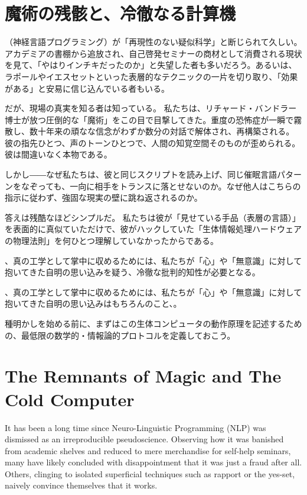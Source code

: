 \ifja
    \chapter{魔術の残骸と、冷徹なる計算機}
    \NLP（神経言語プログラミング）が「再現性のない疑似科学」と断じられて久しい。アカデミアの書棚から追放され、自己啓発セミナーの商材として消費される現状を見て、「やはりインチキだったのか」と失望した者も多いだろう。あるいは、ラポールやイエスセットといった表層的なテクニックの一片を切り取り、「効果がある」と安易に信じ込んでいる者もいる。

    だが、現場の真実を知る者は知っている。
    私たちは、リチャード・バンドラー博士が放つ圧倒的な「魔術」をこの目で目撃してきた。重度の恐怖症が一瞬で霧散し、数十年来の頑なな信念がわずか数分の対話で解体され、再構築される。彼の指先ひとつ、声のトーンひとつで、人間の知覚空間そのものが歪められる。彼は間違いなく本物である。

    しかし――なぜ私たちは、彼と同じスクリプトを読み上げ、同じ催眠言語パターンをなぞっても、一向に相手をトランスに落とせないのか。なぜ他人はこちらの指示に従わず、強固な現実の壁に跳ね返されるのか。

    答えは残酷なほどシンプルだ。
    私たちは彼が「見せている手品（表層の言語）」を表面的に真似ていただけで、彼がハックしていた「生体情報処理ハードウェアの物理法則」を何ひとつ理解していなかったからである。

    、真の工学として掌中に収めるためには、私たちが「心」や「無意識」に対して抱いてきた自明の思い込みを疑う、冷徹な批判的知性が必要となる。

    、真の工学として掌中に収めるためには、私たちが「心」や「無意識」に対して抱いてきた自明の思い込みはもちろんのこと、。

    種明かしを始める前に、まずはこの生体コンピュータの動作原理を記述するための、最低限の数学的・情報論的プロトコルを定義しておこう。
\else
    \chapter{The Remnants of Magic and The Cold Computer}
    It has been a long time since Neuro-Linguistic Programming (NLP) was dismissed as an irreproducible pseudoscience. Observing how it was banished from academic shelves and reduced to mere merchandise for self-help seminars, many have likely concluded with disappointment that it was just a fraud after all. Others, clinging to isolated superficial techniques such as rapport or the yes-set, naively convince themselves that it works.

